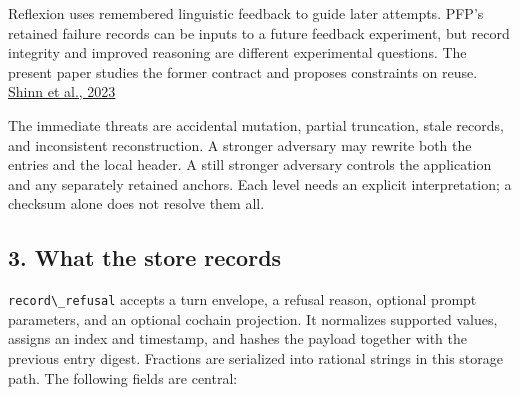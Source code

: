 \documentclass[
  11pt,
]{article}
\newcommand{\passthrough}[1]{#1}
\begin{document}
Reflexion uses remembered linguistic feedback to guide later attempts.
PFP's retained failure records can be inputs to a future feedback
experiment, but record integrity and improved reasoning are different
experimental questions. The present paper studies the former contract
and proposes constraints on reuse.
\href{https://arxiv.org/abs/2303.11366v4}{Shinn et al., 2023}

The immediate threats are accidental mutation, partial truncation, stale
records, and inconsistent reconstruction. A stronger adversary may
rewrite both the entries and the local header. A still stronger
adversary controls the application and any separately retained anchors.
Each level needs an explicit interpretation; a checksum alone does not
resolve them all.

\subsection{3. What the store records}\label{what-the-store-records}

\passthrough{\lstinline!record\_refusal!} accepts a turn envelope, a
refusal reason, optional prompt parameters, and an optional cochain
projection. It normalizes supported values, assigns an index and
timestamp, and hashes the payload together with the previous entry
digest. Fractions are serialized into rational strings in this storage
path. The following fields are central:
\end{document}
